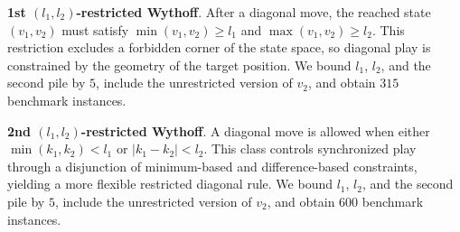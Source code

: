 \documentclass[review]{elsarticle}
\newcommand{\set}[1]{\{ #1 \}}
\newcommand{\tuple}[1]{\langle {#1} \rangle}
\newcommand{\true}{\top}
\newcommand{\statevar}{\mathcal{X}}
\newcommand{\act}{\mathcal{A}}
\newcommand{\constraint}{\mathcal{C}}
\newcommand{\estate}{\mathcal{E}}
\newcommand{\pre}{\mathtt{pre}}
\newcommand{\eff}{\mathtt{eff}}
\begin{document}
\textbf{1st $(l_1, l_2)$-restricted Wythoff}. After a diagonal move, the reached state $(v_1,v_2)$ must satisfy $\min(v_1,v_2) \ge l_1$ and $\max(v_1,v_2) \ge l_2$.
This restriction excludes a forbidden corner of the state space, so diagonal play is constrained by the geometry of the target position.
We bound $l_1$, $l_2$, and the second pile by $5$, include the unrestricted version of $v_2$, and obtain $315$ benchmark instances.

\textbf{2nd $(l_1,l_2)$-restricted Wythoff}. A diagonal move is allowed when either $\min(k_1,k_2) < l_1$ or $|k_1-k_2| < l_2$.
This class controls synchronized play through a disjunction of minimum-based and difference-based constraints, yielding a more flexible restricted diagonal rule.
We bound $l_1$, $l_2$, and the second pile by $5$, include the unrestricted version of $v_2$, and obtain $600$ benchmark instances.
\end{document}
